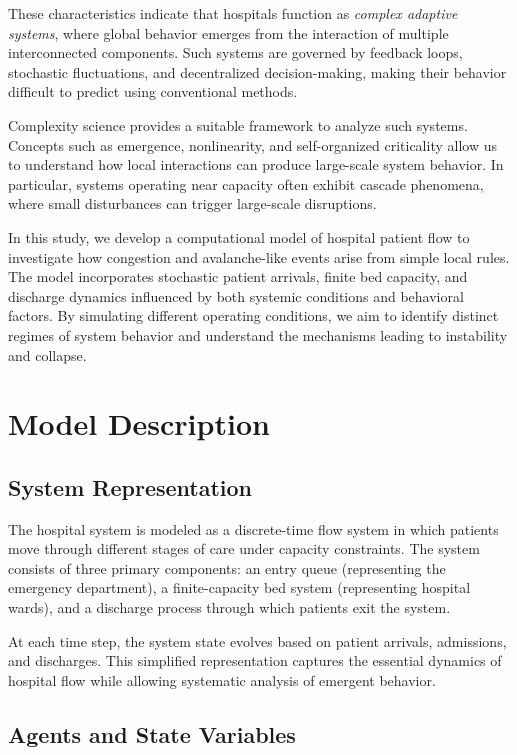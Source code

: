\documentclass[11pt]{article}
\begin{document}
These characteristics indicate that hospitals function as \textit{complex adaptive systems}, where global behavior emerges from the interaction of multiple interconnected components. Such systems are governed by feedback loops, stochastic fluctuations, and decentralized decision-making, making their behavior difficult to predict using conventional methods.

Complexity science provides a suitable framework to analyze such systems. Concepts such as emergence, nonlinearity, and self-organized criticality allow us to understand how local interactions can produce large-scale system behavior. In particular, systems operating near capacity often exhibit cascade phenomena, where small disturbances can trigger large-scale disruptions.

In this study, we develop a computational model of hospital patient flow to investigate how congestion and avalanche-like events arise from simple local rules. The model incorporates stochastic patient arrivals, finite bed capacity, and discharge dynamics influenced by both systemic conditions and behavioral factors. By simulating different operating conditions, we aim to identify distinct regimes of system behavior and understand the mechanisms leading to instability and collapse.
\section{Model Description}

\subsection{System Representation}

The hospital system is modeled as a discrete-time flow system in which patients move through different stages of care under capacity constraints. The system consists of three primary components: an entry queue (representing the emergency department), a finite-capacity bed system (representing hospital wards), and a discharge process through which patients exit the system.

At each time step, the system state evolves based on patient arrivals, admissions, and discharges. This simplified representation captures the essential dynamics of hospital flow while allowing systematic analysis of emergent behavior.

\subsection{Agents and State Variables}
\end{document}
